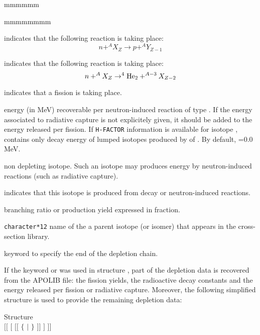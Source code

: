 \begin{ListeDeDescription}{mmmmmm}
\begin{ListeDeDescription}{mmmmmmmm}
\item[\moc{NP}] indicates that the following reaction is taking place:
$$ n +^{A}X_Z \to p + ^AY_{Z-1}$$

\item[\moc{NA}] indicates that the following reaction is taking place:
$$ n +^{A}X_Z \to ^4{\rm He}_2 + ^{A-3}X_{Z-2}$$

\item[\moc{NFTOT}] indicates that a fission is taking place.
\end{ListeDeDescription}

\item[\dusa{energy}] energy (in MeV) recoverable per neutron-induced
reaction of type . If the energy associated to radiative capture
is not explicitely given, it should be added to the energy released per fission.
If {\tt H-FACTOR} information is available for isotope , 
contains only decay energy of lumped isotopes produced by  of .
By default, =0.0 MeV.

\item[\moc{STABLE}] non depleting isotope. Such an isotope may produces
energy by neutron-induced reactions (such as radiative capture).

\item[\moc{FROM}] indicates that this isotope is produced from decay or
neutron-induced reactions.

\item[\dusa{yield}] branching ratio or production yield expressed in fraction.

\item[\dusa{NAMPAR}] {\tt character*12} name of the a parent isotope
(or isomer) that appears in the cross-section library.

\item[\moc{ENDCHAIN}] keyword to specify the end of the depletion chain.

\end{ListeDeDescription}

\vskip 0.15cm

If the keyword  or  was used in structure , part of the
depletion data is recovered from the APOLIB file: the fission yields, the
radioactive decay constants and the energy released per fission or radiative
capture. Moreover, the following simplified structure is used to provide the
remaining depletion data:

\begin{DataStructure}{Structure }
 \\
$[[$  $[$  $[[$ $\{$  $|$  $\}$
  $]]$ $]$ $]]$\\
\end{DataStructure}

